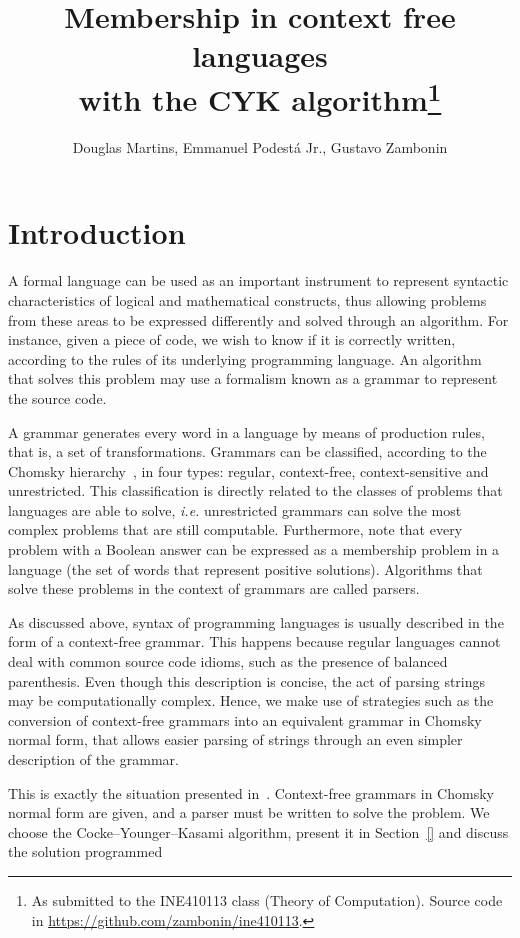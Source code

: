\documentclass[12pt]{article}
\title{Membership in context free languages \\ with the CYK algorithm\footnote{
    As submitted to the INE410113 class (Theory of Computation). Source code in \url{https://github.com/zambonin/ine410113}.}}
\author{Douglas Martins\inst{1}, Emmanuel Podestá Jr.\inst{1}, Gustavo Zambonin\inst{1}}
\begin{document}
 

\maketitle

\section{Introduction}\label{sec:intro}
A formal language can be used as an important instrument to represent syntactic characteristics of logical and mathematical constructs, thus allowing problems from these areas to be expressed differently and solved through an algorithm. For instance, given a piece of code, we wish to know if it is correctly written, according to the rules of its underlying programming language. An algorithm that solves this problem may use a formalism known as a grammar to represent the source code.

A grammar generates every word in a language by means of production rules, that is, a set of transformations. Grammars can be classified, according to the Chomsky hierarchy~\cite{}, in four types: regular, context-free, context-sensitive and unrestricted. This classification is directly related to the classes of problems that languages are able to solve, \emph{i.e.} unrestricted grammars can solve the most complex problems that are still computable. Furthermore, note that every problem with a Boolean answer can be expressed as a membership problem in a language (the set of words that represent positive solutions). Algorithms that solve these problems in the context of grammars are called parsers.

As discussed above, syntax of programming languages is usually described in the form of a context-free grammar. This happens because regular languages cannot deal with common source code idioms, such as the presence of balanced parenthesis. Even though this description is concise, the act of parsing strings may be computationally complex. Hence, we make use of strategies such as the conversion of context-free grammars into an equivalent grammar in Chomsky normal form, that allows easier parsing of strings through an even simpler description of the grammar.

This is exactly the situation presented in~\cite{}. Context-free grammars in Chomsky normal form are given, and a parser must be written to solve the problem. We choose the Cocke–Younger–Kasami algorithm, present it in Section~\ref{} and discuss the \href{}{}solution programmed
\end{document}
